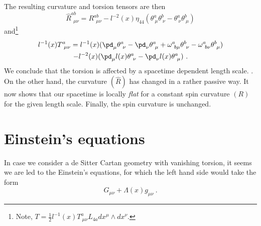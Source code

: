 \documentclass[11pt]{amsart}
\begin{document}
The resulting curvature and torsion tensors are then
%
\begin{displaymath}
	\hat{R}^{ab}_{~~\mu\nu} = R^{ab}_{~~\mu\nu} - l^{-2}(x) 
	\eta_{44}(\theta^a_{~\mu}\theta^b_{~\nu} - 
	\theta^a_{~\nu}\theta^b_{~\mu})
\end{displaymath}
and\footnote{Note, $T = \tfrac{1}{2}l^{-1}(x) 
	T^a_{~\mu\nu}L_{4a}dx^\mu\wedge dx^\nu$.}
\begin{multline}
	l^{-1}(x) T^a_{~\mu\nu} = l^{-1}(x) (\pd_\mu\theta^a_{~\nu} - 
	\pd_\nu\theta^a_{~\mu} + \omega^a_{~b\mu}\theta^b_{~\nu} - 
	\omega^a_{~b\nu}\theta^b_{~\mu}) \\
	- l^{-2}(x)( \pd_\mu l(x) \theta^a_{~\nu} - \pd_\nu l(x) 
	\theta^a_{~\mu})~.
\end{multline}
We conclude that the torsion is affected by a spacetime dependent 
length scale. {}.  On the 
other hand, the curvature $(\hat{R})$ has changed in a rather 
passive way. It now shows that our spacetime is locally 
\emph{flat} for a constant spin curvature $(R)$ for the given 
length scale.  Finally, the spin curvature is unchanged.  {}

\section{Einstein's equations}

In case we consider a de Sitter Cartan geometry with vanishing 
torsion, it seems we are led to the Einstein's equations, for 
which the left hand side would take the form {}
%
\begin{equation}
	G_{\mu\nu} + \Lambda(x)g_{\mu\nu}~.
\end{equation}



\end{document}
